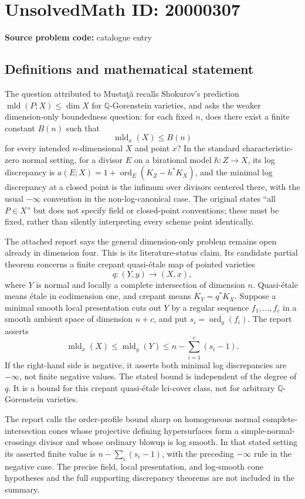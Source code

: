 \documentclass[11pt]{article}
\newcommand{\Q}{\mathbb{Q}}
\begin{document}
\section*{UnsolvedMath ID: 20000307}
\textbf{Source problem code:} catalogue entry
\subsection{Definitions and mathematical statement}
The question attributed to Musta\c{t}\u{a} recalls Shokurov's prediction \(\operatorname{mld}(P;X)\leq\dim X\) for \(\Q\)-Gorenstein varieties, and asks the weaker dimension-only boundedness question: for each fixed \(n\), does there exist a finite constant \(B(n)\) such that
\[
\operatorname{mld}_x(X)\leq B(n)
\]
for every intended \(n\)-dimensional \(X\) and point \(x\)? In the standard characteristic-zero normal setting, for a divisor \(E\) on a birational model \(h:Z\to X\), its log discrepancy is \(a(E;X)=1+\operatorname{ord}_E(K_Z-h^*K_X)\), and the minimal log discrepancy at a closed point is the infimum over divisors centered there, with the usual \(-\infty\) convention in the non-log-canonical case. The original states ``all \(P\in X\)'' but does not specify field or closed-point conventions; these must be fixed, rather than silently interpreting every scheme point identically.

The attached report says the general dimension-only problem remains open already in dimension four. This is its literature-status claim. Its candidate partial theorem concerns a finite crepant quasi-\'etale map of pointed varieties
\[
q:(Y,y)\to(X,x),
\]
where \(Y\) is normal and locally a complete intersection of dimension \(n\). Quasi-\'etale means \'etale in codimension one, and crepant means \(K_Y=q^*K_X\). Suppose a minimal smooth local presentation cuts out \(Y\) by a regular sequence \(f_1,\ldots,f_c\) in a smooth ambient space of dimension \(n+c\), and put \(s_i=\operatorname{ord}_y(f_i)\). The report asserts
\[
\operatorname{mld}_x(X)\leq\operatorname{mld}_y(Y)
\leq n-\sum_{i=1}^c(s_i-1).
\]
If the right-hand side is negative, it asserts both minimal log discrepancies are \(-\infty\), not finite negative values. The stated bound is independent of the degree of \(q\). It is a bound for this crepant quasi-\'etale lci-cover class, not for arbitrary \(\Q\)-Gorenstein varieties.

The report calls the order-profile bound sharp on homogeneous normal complete-intersection cones whose projective defining hypersurfaces form a simple-normal-crossings divisor and whose ordinary blowup is log smooth. In that stated setting its asserted finite value is \(n-\sum_i(s_i-1)\), with the preceding \(-\infty\) rule in the negative case. The precise field, local presentation, and log-smooth cone hypotheses and the full supporting discrepancy theorems are not included in the summary.
\end{document}

